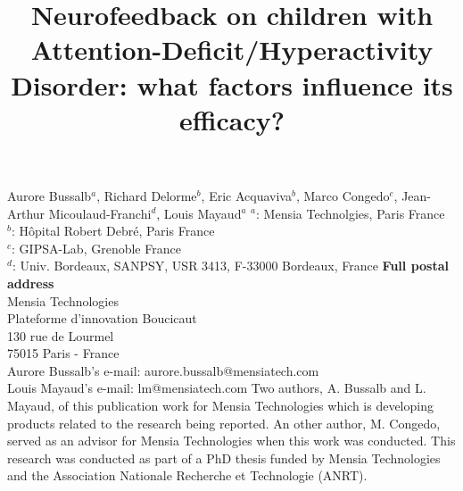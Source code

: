 

\title{Neurofeedback on children with Attention-Deficit/Hyperactivity Disorder: what factors influence its efficacy?} %
\maketitle
\noindent Aurore Bussalb$^a$, Richard Delorme$^b$, Eric Acquaviva$^b$, Marco Congedo$^c$, Jean-Arthur Micoulaud-Franchi$^d$, Louis Mayaud$^a$ 
\smallbreak
\noindent $^a$: Mensia Technolgies, Paris France \\
\noindent $^b$: Hôpital Robert Debré, Paris France \\ %
\noindent $^c$: GIPSA-Lab, Grenoble France \\
\noindent $^d$: Univ. Bordeaux, SANPSY, USR 3413, F-33000 Bordeaux, France 
\smallbreak
\noindent\textbf{Full postal address} \\
Mensia Technologies \\
Plateforme d'innovation Boucicaut \\
130 rue de Lourmel \\
75015 Paris - France \\
Aurore Bussalb's e-mail: aurore.bussalb@mensiatech.com \\
Louis Mayaud's e-mail: lm@mensiatech.com 
\smallbreak
Two authors, A. Bussalb and L. Mayaud, of this publication work for Mensia Technologies which is developing products related to the research being reported.
An other author, M. Congedo, served as an advisor for Mensia Technologies when this work was conducted. 
\smallbreak
This research was conducted as part of a PhD thesis funded by Mensia Technologies and the Association Nationale Recherche et Technologie (ANRT).